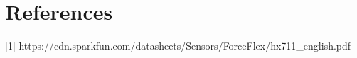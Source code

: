 \pagebreak
\section{References}
\label{sec:References}

[1] https://cdn.sparkfun.com/datasheets/Sensors/ForceFlex/hx711_english.pdf